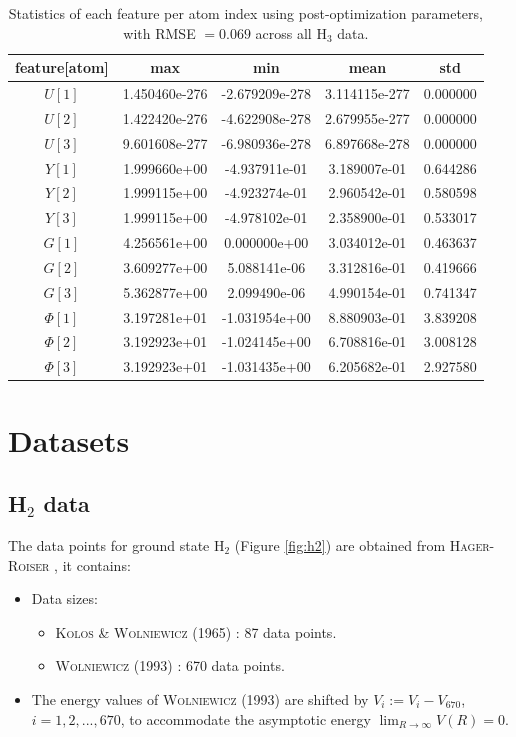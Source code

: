 \documentclass[12pt]{article}
\begin{document}
\begin{table}[!htbp]
\centering
\caption{Statistics of each feature per atom index using post-optimization parameters, with RMSE $= 0.069$ across all H$_3$ data.}
\label{tb:featstat_copt}
\begin{tabular}{ccccc}
\toprule
feature[atom] &   max & min & mean &  std \\
\midrule
$U[1]$    &  1.450460e-276 & -2.679209e-278 &  3.114115e-277 &  0.000000 \\
$U[2]$    &  1.422420e-276 & -4.622908e-278 &  2.679955e-277 &  0.000000 \\
$U[3]$    &  9.601608e-277 & -6.980936e-278 &  6.897668e-278 &  0.000000 \\
$Y[1]$    &   1.999660e+00 &  -4.937911e-01 &   3.189007e-01 &  0.644286 \\
$Y[2]$    &   1.999115e+00 &  -4.923274e-01 &   2.960542e-01 &  0.580598 \\
$Y[3]$    &   1.999115e+00 &  -4.978102e-01 &   2.358900e-01 &  0.533017 \\
$G[1]$    &   4.256561e+00 &   0.000000e+00 &   3.034012e-01 &  0.463637 \\
$G[2]$    &   3.609277e+00 &   5.088141e-06 &   3.312816e-01 &  0.419666 \\
$G[3]$    &   5.362877e+00 &   2.099490e-06 &   4.990154e-01 &  0.741347 \\
$\Phi[1]$ &   3.197281e+01 &  -1.031954e+00 &   8.880903e-01 &  3.839208 \\
$\Phi[2]$ &   3.192923e+01 &  -1.024145e+00 &   6.708816e-01 &  3.008128 \\
$\Phi[3]$ &   3.192923e+01 &  -1.031435e+00 &   6.205682e-01 &  2.927580 \\
\bottomrule
\end{tabular}
\end{table}

\section{Datasets}
\subsection{H$_2$ data}
The data points for ground state H$_2$ (Figure \ref{fig:h2}) are obtained from \textsc{Hager-Roiser} \cite{ulrik}, it contains:
\begin{itemize}
    \item Data sizes:
    \begin{itemize}
        \item \textsc{Kolos \& Wolniewicz} (1965) \cite{idx166}: 87 data points.
        \item \textsc{Wolniewicz} (1993) \cite{idx167}: 670 data points.
    \end{itemize}
    \item The energy values of \textsc{Wolniewicz} (1993) are shifted by $V_i := V_i-V_{670}$, $i=1,2,...,670$, to accommodate the asymptotic energy $\lim_{R \to \infty} V(R) = 0$.
\end{itemize}
\end{document}
